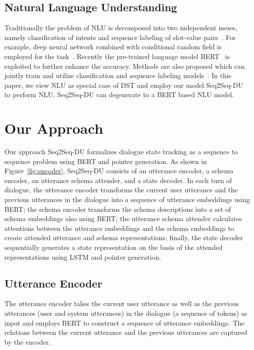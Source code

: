 \documentclass[11pt]{article}
\begin{document}
\subsection{Natural Language Understanding}
Traditionally the problem of NLU is decomposed into two independent issues, namely classification of intents and sequence labeling of slot-value pairs~\citep{liu2016attention, hakkani2016multi}. For example, deep neural network combined with conditional random field is employed for the task~\citep{yao2014recurrent}. Recently the pre-trained language model BERT~\citep{chen2019bert} is exploited to further enhance the accuracy. Methods are also proposed which can jointly train and utilize classification and sequence labeling models~\citep{chen2019bert, goo2018slot}. In this paper, we view NLU as special case of DST and employ our model Seq2Seq-DU to perform NLU. Seq2Seq-DU can degenerate to a BERT based NLU model.






\section{Our Approach}
\label{Approach}

Our approach Seq2Seq-DU formalizes dialogue state tracking as a sequence to sequence problem using BERT and pointer generation.
As shown in Figure~\ref{fig:encoder}, Seq2Seq-DU consists of an utterance encoder, a schema encoder, an utterance schema attender, and a state decoder. In each turn of dialogue, the utterance encoder transforms the current user utterance and the previous utterances in the dialogue into a sequence of utterance embeddings using BERT; the schema encoder transforms the schema descriptions into a set of schema embeddings also using BERT; the utterance schema attender calculates attentions between the utterance embeddings and the schema embeddings to create attended utterance and schema representations; finally, the state decoder sequentially generates a state representation on the basis of the attended representations using LSTM and pointer generation. 

\subsection{Utterance Encoder}
The utterance encoder takes the current user utterance as well as the previous utterances (user and system utterances) in the dialogue (a sequence of tokens) as input and employs BERT to construct a sequence of utterance embeddings. The relations between the current utterance and the previous utterances are captured by the encoder.
\end{document}
